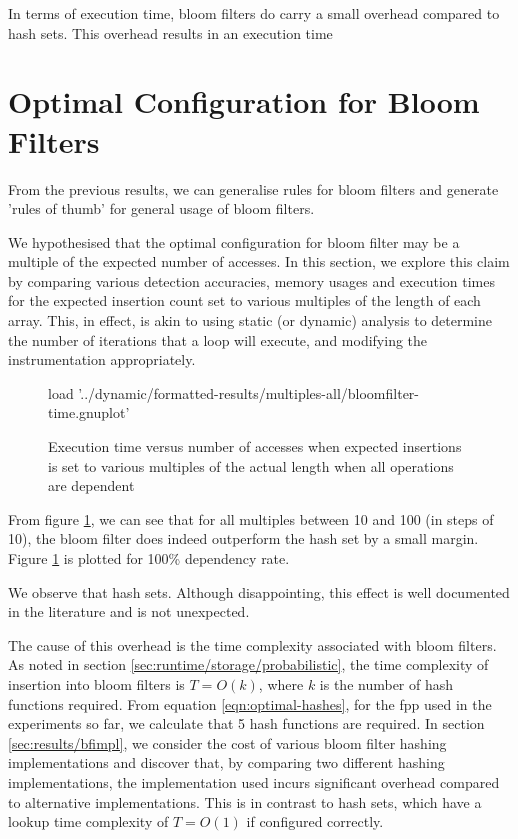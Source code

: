 In terms of execution time, bloom filters do carry a small overhead compared to hash sets. This overhead results in an execution time 
 
\section{Optimal Configuration for Bloom Filters} \label{sec:results/opt-conf}
From the previous results, we can generalise rules for bloom filters and generate 'rules of thumb' for general usage of bloom filters.

We hypothesised that the optimal configuration for bloom filter may be a multiple of the expected number of accesses. In this section, we explore this claim by comparing various detection accuracies, memory usages and execution times for the expected insertion count set to various multiples of the length of each array. This, in effect, is akin to using static (or dynamic) analysis to determine the number of iterations that a loop will execute, and modifying the instrumentation appropriately.

\begin{figure}
	\centering
	\begin{gnuplot}[terminal=pdf]
	load '../dynamic/formatted-results/multiples-all/bloomfilter-time.gnuplot'
	\end{gnuplot}
	\caption{Execution time versus number of accesses when expected insertions is set to various multiples of the actual length when all operations are dependent}
	\label{chart:multiples-all}
\end{figure}

From figure \ref{chart:multiples-all}, we can see that for all multiples between 10 and 100 (in steps of 10), the bloom filter does indeed outperform the hash set by a small margin. Figure \ref{chart:multiples-all} is plotted for 100\% dependency rate.

We observe that hash sets. Although disappointing, this effect is well documented in the literature \citep{Levenberg2007,Dillinger2004} and is not unexpected. 

The cause of this overhead is the time complexity associated with bloom filters. As noted in section \ref{sec:runtime/storage/probabilistic}, the time complexity of insertion into bloom filters is $T=O(k)$, where $k$ is the number of hash functions required. From equation \ref{eqn:optimal-hashes}, for the fpp used in the experiments so far, we calculate that 5 hash functions are required. In section \ref{sec:results/bfimpl}, we consider the cost of various bloom filter hashing implementations and discover that, by comparing two different hashing implementations, the implementation used incurs significant overhead compared to alternative implementations. This is in contrast to hash sets, which have a lookup time complexity of $T=O(1)$ if configured correctly.


